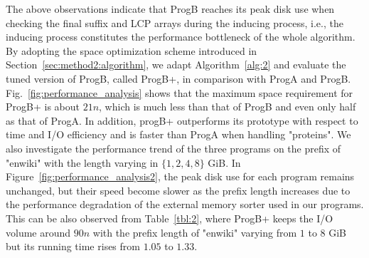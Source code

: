 \documentclass[10pt,journal,compsoc]{IEEEtran}
\begin{document}
The above observations indicate that ProgB reaches its peak disk use when checking the final suffix and LCP arrays during the inducing process, i.e., the inducing process constitutes the performance bottleneck of the whole algorithm. By adopting the space optimization scheme introduced in Section~\ref{sec:method2:algorithm}, we adapt Algorithm~\ref{alg:2} and evaluate the tuned version of ProgB, called ProgB+, in comparison with ProgA and ProgB. Fig.~\ref{fig:performance_analysis} shows that the maximum space requirement for ProgB+ is about $21n$, which is much less than that of ProgB and even only half as that of ProgA. In addition, progB+ outperforms its prototype with respect to time and I/O efficiency and is faster than ProgA when handling "proteins". We also investigate the performance trend of the three programs on the prefix of "enwiki" with the length varying in $\{1, 2, 4, 8\}$ GiB. In Figure~\ref{fig:performance_analysis2}, the peak disk use for each program remains unchanged, but their speed become slower as the prefix length increases due to the performance degradation of the external memory sorter used in our programs. This can be also observed from Table~\ref{tbl:2}, where ProgB+ keeps the I/O volume around $90n$ with the prefix length of "enwiki" varying from $1$ to $8$ GiB but its running time rises from $1.05$ to $1.33$.
\end{document}
